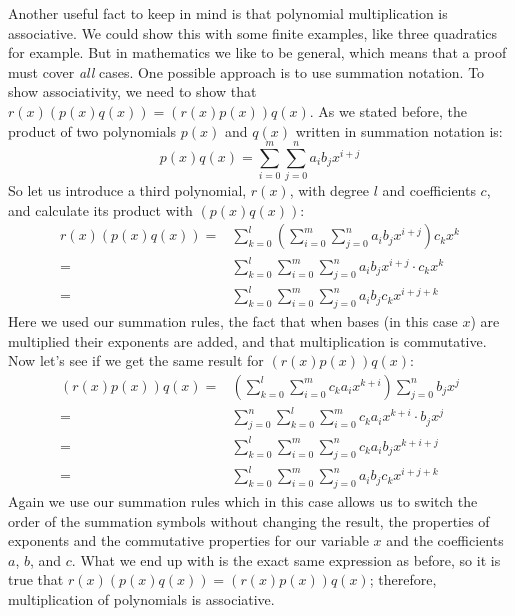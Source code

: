 Another useful fact to keep in mind is that polynomial multiplication is associative.  We could show this with some finite examples, like three quadratics for example. But in mathematics we like to be general, which means that a proof must cover \emph{all} cases.  One possible approach is to use summation notation. To show associativity, we need to show that $r(x)(p(x)q(x))=(r(x)p(x))q(x)$.  As we stated before, the product of two polynomials $p(x)$ and $q(x)$ written in summation notation is:
\[
p(x) q(x) =\sum_{i=0}^{m}\sum_{j=0}^{n}a_i b_j x^{i+j}
\]
So let us introduce a third polynomial, $r(x)$, with degree $l$ and coefficients $c$, and calculate its product with $(p(x)q(x))$:
\begin{align*}
r(x)(p(x) q(x)) =& \sum_{k=0}^{l} \left( \sum_{i=0}^{m}\sum_{j=0}^{n}a_i b_j x^{i+j} \right) c_k x^k \\
=&\sum_{k=0}^{l} \sum_{i=0}^{m}\sum_{j=0}^{n} a_i b_j x^{i+j} \cdot c_k x^k \\
=& \sum_{k=0}^{l} \sum_{i=0}^{m}\sum_{j=0}^{n} a_i b_j  c_k x^{i+j+k} 
\end{align*}
Here we used our summation rules, the fact that when bases (in this case $x$) are multiplied their exponents are added, and that multiplication is commutative.  Now let's see if we get the same result for $(r(x)p(x))q(x)$:
\begin{align*}
(r(x)p(x))q(x) =& \left(  \sum_{k=0}^{l} \sum_{i=0}^{m} c_k a_i x^{k+i} \right)\sum_{j=0}^{n}  b_j x^j \\
=& \sum_{j=0}^{n} \sum_{k=0}^{l} \sum_{i=0}^{m}  c_k a_i x^{k+i} \cdot  b_j x^j\\
=&  \sum_{k=0}^{l} \sum_{i=0}^{m}\sum_{j=0}^{n} c_k a_i b_j x^{k+i+j}\\
=& \sum_{k=0}^{l} \sum_{i=0}^{m}\sum_{j=0}^{n} a_i b_j  c_k x^{i+j+k} 
\end{align*}
Again we use our summation rules which in this case allows us to switch the order of the summation symbols without changing the result, the properties of exponents and the commutative properties for our variable $x$ and the coefficients $a$, $b$, and $c$.  What we end up with is the exact same expression as before, so it is true that $r(x)(p(x)q(x))=(r(x)p(x))q(x)$; therefore, multiplication of polynomials is associative. 
